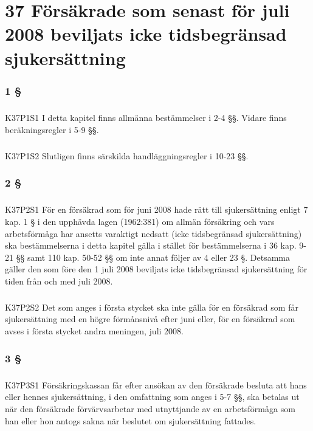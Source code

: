 \documentclass[a4paper,notitlepage,openany,10pt]{book}
\begin{document}
\chapter*{37 Försäkrade som senast för juli 2008 beviljats icke tidsbegränsad sjukersättning}
\subsection*{1 §}
\paragraph*{}
{\tiny K37P1S1}
I detta kapitel finns allmänna bestämmelser i 2-4 §§.
Vidare finns beräkningsregler i 5-9 §§.
\paragraph*{}
{\tiny K37P1S2}
Slutligen finns särskilda handläggningsregler i 10-23 §§.
\subsection*{2 §}
\paragraph*{}
{\tiny K37P2S1}
För en försäkrad som för juni 2008 hade rätt till sjukersättning enligt 7 kap. 1 § i den upphävda lagen (1962:381) om allmän försäkring och vars arbetsförmåga har ansetts varaktigt nedsatt (icke tidsbegränsad sjukersättning) ska bestämmelserna i detta kapitel gälla i stället för bestämmelserna i 36 kap. 9-21 §§ samt 110 kap. 50-52 §§ om inte annat följer av 4 eller 23 §. Detsamma gäller den som före den 1 juli 2008 beviljats icke tidsbegränsad sjukersättning för tiden från och med juli 2008.
\paragraph*{}
{\tiny K37P2S2}
Det som anges i första stycket ska inte gälla för en försäkrad som får sjukersättning med en högre förmånsnivå efter juni eller, för en försäkrad som avses i första stycket andra meningen, juli 2008.
\subsection*{3 §}
\paragraph*{}
{\tiny K37P3S1}
Försäkringskassan får efter ansökan av den försäkrade besluta att hans eller hennes sjukersättning, i den omfattning som anges i 5-7 §§, ska betalas ut när den försäkrade förvärvsarbetar med utnyttjande av en arbetsförmåga som han eller hon antogs sakna när beslutet om sjukersättning fattades.
\end{document}
